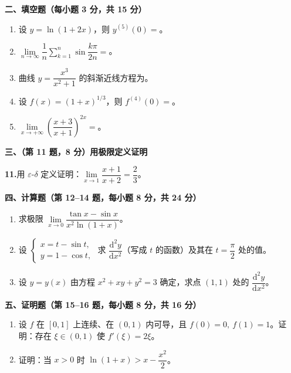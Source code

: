 \documentclass[11pt,a4paper]{ctexart}
\newcommand{\blank}{\underline{\hspace{2.2cm}}}
\newcommand{\D}{\mathrm{d}}
\begin{document}
\noindent\textbf{二、填空题（每小题 3 分，共 15 分）}

\begin{enumerate}[label=\textbf{\arabic*.},leftmargin=2.2em,itemsep=8pt,start=6]

\item 设 $y=\ln(1+2x)$，则 $y^{(5)}(0)=$\blank。

\item $\lim\limits_{n\to\infty}\dfrac1n\sum\limits_{k=1}^n\sin\dfrac{k\pi}{2n}=$\blank。

\item 曲线 $y=\dfrac{x^3}{x^2+1}$ 的斜渐近线方程为\blank。

\item 设 $f(x)=(1+x)^{1/3}$，则 $f^{(4)}(0)=$\blank。

\item $\lim\limits_{x\to+\infty}\left(\dfrac{x+3}{x+1}\right)^{2x}=$\blank。

\end{enumerate}

\noindent\textbf{三、（第 11 题，8 分）用极限定义证明}

\noindent\textbf{11.}\quad 用 $\varepsilon$-$\delta$ 定义证明：$\lim\limits_{x\to1}\dfrac{x+1}{x+2}=\dfrac23$。

\vspace{4pt}
\noindent\textbf{四、计算题（第 12--14 题，每小题 8 分，共 24 分）}

\begin{enumerate}[label=\textbf{\arabic*.},leftmargin=2.2em,itemsep=9pt,start=12]

\item 求极限 $\lim\limits_{x\to0}\dfrac{\tan x-\sin x}{x^2\ln(1+x)}$。

\item 设 $\begin{cases}x=t-\sin t,\\ y=1-\cos t,\end{cases}$ 求 $\dfrac{\D^2y}{\D x^2}$（写成 $t$ 的函数）及其在 $t=\dfrac\pi2$ 处的值。

\item 设 $y=y(x)$ 由方程 $x^2+xy+y^2=3$ 确定，求点 $(1,1)$ 处的 $\dfrac{\D^2y}{\D x^2}$。

\end{enumerate}

\noindent\textbf{五、证明题（第 15--16 题，每小题 8 分，共 16 分）}

\begin{enumerate}[label=\textbf{\arabic*.},leftmargin=2.2em,itemsep=9pt,start=15]

\item 设 $f$ 在 $[0,1]$ 上连续、在 $(0,1)$ 内可导，且 $f(0)=0,\ f(1)=1$。证明：存在 $\xi\in(0,1)$ 使 $f'(\xi)=2\xi$。

\item 证明：当 $x>0$ 时 $\ln(1+x)>x-\dfrac{x^2}{2}$。

\end{enumerate}
\end{document}
